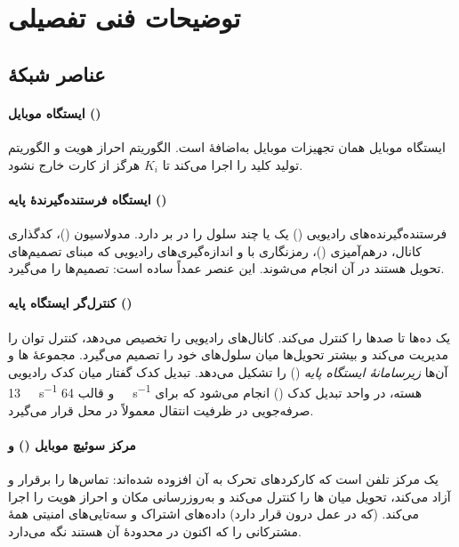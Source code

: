 \documentclass[11pt,a4paper]{article}
\begin{document}
\section{توضیحات فنی تفصیلی}\label{sec:technical}

\subsection{عناصر شبکهٔ }
\paragraph{ایستگاه موبایل ()} ایستگاه موبایل همان تجهیزات موبایل به‌اضافهٔ 
است.  الگوریتم احراز هویت  و الگوریتم تولید کلید  را اجرا می‌کند
تا $K_i$ هرگز از کارت خارج نشود.

\paragraph{ایستگاه فرستنده‌گیرندهٔ پایه ()}  فرستنده‌گیرنده‌های رادیویی
() یک یا چند سلول را در بر دارد. مدولاسیون ()، کدگذاری کانال،
درهم‌آمیزی ()، رمزنگاری با  و اندازه‌گیری‌های رادیویی که مبنای
تصمیم‌های تحویل هستند در آن انجام می‌شوند. این عنصر عمداً ساده است: تصمیم‌ها را  می‌گیرد.

\paragraph{کنترل‌گر ایستگاه پایه ()} یک  ده‌ها تا صدها  را کنترل
می‌کند. کانال‌های رادیویی را تخصیص می‌دهد، کنترل توان را مدیریت می‌کند و بیشتر تحویل‌ها
میان سلول‌های خود را تصمیم می‌گیرد. مجموعهٔ ها و  آن‌ها \emph{زیرسامانهٔ
ایستگاه پایه} () را تشکیل می‌دهد. تبدیل کدک گفتار میان کدک رادیویی
\qty{13}{\kilo\bit\per\second} و قالب  \qty{64}{\kilo\bit\per\second} هسته، در
واحد تبدیل کدک () انجام می‌شود که برای صرفه‌جویی در ظرفیت انتقال معمولاً در
محل  قرار می‌گیرد.

\paragraph{مرکز سوئیچ موبایل () و }  یک مرکز تلفن است که
کارکردهای تحرک به آن افزوده شده‌اند: تماس‌ها را برقرار و آزاد می‌کند، تحویل میان
ها را کنترل می‌کند و به‌روزرسانی مکان و احراز هویت را اجرا می‌کند. 
(که در عمل درون  قرار دارد) داده‌های اشتراک و سه‌تایی‌های امنیتی همهٔ مشترکانی
را که اکنون در محدودهٔ آن هستند نگه می‌دارد.
\end{document}

